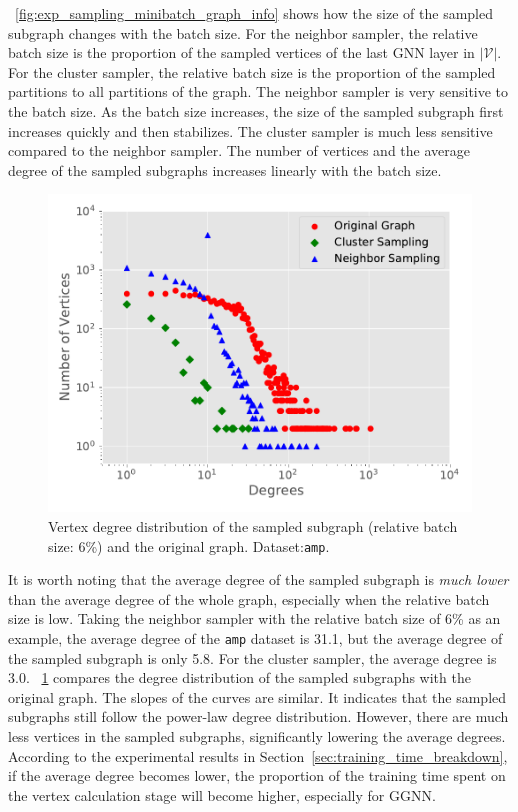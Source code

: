 \figurename~\ref{fig:exp_sampling_minibatch_graph_info} shows how the size of the sampled subgraph changes with the batch size.
For the neighbor sampler, the relative batch size is the proportion of the sampled vertices of the last GNN layer in $|\mathcal{V}|$.
For the cluster sampler, the relative batch size is the proportion of the sampled partitions to all partitions of the graph.
The neighbor sampler is very sensitive to the batch size.
As the batch size increases, the size of the sampled subgraph first increases quickly and then stabilizes.
The cluster sampler is much less sensitive compared to the neighbor sampler.
The number of vertices and the average degree of the sampled subgraphs increases linearly with the batch size.

\begin{figure}[tbp]
    \centering
    \includegraphics[width=0.4\columnwidth]{figs/experiments/exp_sampling_minibatch_degrees_distribution_amazon-photo.pdf}
    \caption{Vertex degree distribution of the sampled subgraph (relative batch size: 6\%) and the original graph. Dataset:\texttt{amp}.}
    \label{fig:exp_sampling_minibatch_degrees_distribution}
\end{figure}

It is worth noting that the average degree of the sampled subgraph is \emph{much lower} than the average degree of the whole graph, especially when the relative batch size is low.
Taking the neighbor sampler with the relative batch size of 6\% as an example, the average degree of the \texttt{amp} dataset is 31.1, but the average degree of the sampled subgraph is only 5.8.
For the cluster sampler, the average degree is 3.0.
\figurename~\ref{fig:exp_sampling_minibatch_degrees_distribution} compares the degree distribution of the sampled subgraphs with the original graph.
The slopes of the curves are similar.
It indicates that the sampled subgraphs still follow the power-law degree distribution.
However, there are much less vertices in the sampled subgraphs, significantly lowering the average degrees.
According to the experimental results in Section~\ref{sec:training_time_breakdown}, if the average degree becomes lower, the proportion of the training time spent on the vertex calculation stage will become higher, especially for GGNN.

